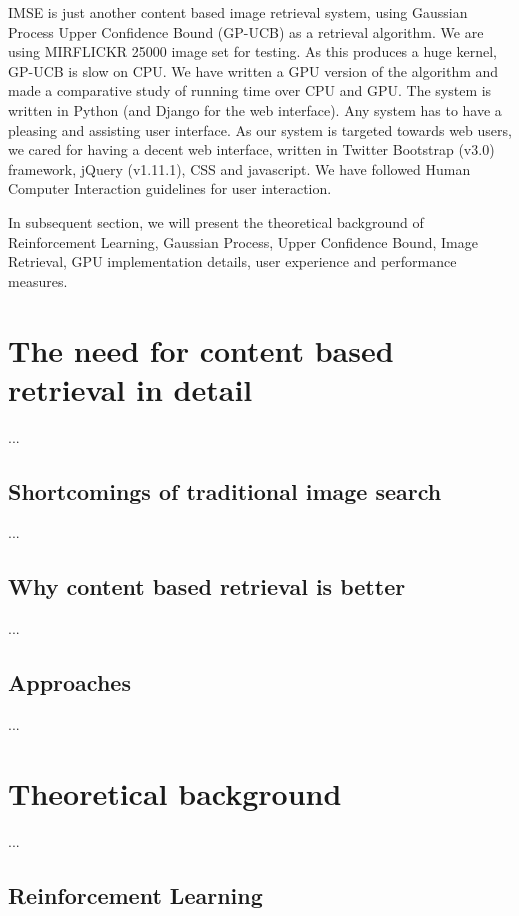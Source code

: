 \documentclass[english]{tktltiki}
\begin{document}
IMSE is just another content based image retrieval system, using Gaussian Process Upper Confidence Bound (GP-UCB) as a retrieval algorithm. We are using MIRFLICKR 25000 image set for testing. As this produces a huge kernel, GP-UCB is slow on CPU. We have written a GPU version of the algorithm and made a comparative study of running time over CPU and GPU. The system is written in Python (and Django for the web interface). Any system has to have a pleasing and assisting user interface. As our system is targeted towards web users, we cared for having a decent web interface, written in Twitter Bootstrap (v3.0) framework, jQuery (v1.11.1), CSS and javascript. We have followed Human Computer Interaction guidelines for user interaction.

In subsequent section, we will present the theoretical background of Reinforcement Learning, Gaussian Process, Upper Confidence Bound, Image Retrieval, GPU implementation details, user experience and performance measures.


\section{The need for content based retrieval in detail}

...

\subsection{Shortcomings of traditional image search}

...

\subsection{Why content based retrieval is better}


...


\subsection{Approaches}

...


\section{Theoretical background}

...


\subsection{Reinforcement Learning}
\end{document}
